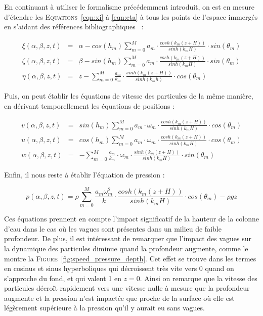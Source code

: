 				En continuant à utiliser le formalisme précédemment introduit, on est en mesure d'étendre les \textsc{Equations}~\ref{eqn:xi} à \ref{eqn:eta} à tous les points de l'espace immergés en s'aidant des références bibliographiques~\cite{dean1991water, MIT_Waves} :

				\begin{eqnarray}
					\xi(\alpha, \beta, z, t) & = & \alpha - cos(h_m) \sum_{m=0}^{M} a_m \cdot \frac{cosh(k_m(z+H))}{sinh(k_m H)} \cdot sin(\theta_m) \\
					\zeta(\alpha, \beta, z, t) & = & \beta - sin(h_m) \sum_{m=0}^{M} a_m \cdot \frac{cosh(k_m(z+H))}{sinh(k_m H)} \cdot sin(\theta_m) \\
					\eta(\alpha, \beta, z, t) & = & z - \sum_{m=0}^{M} \frac{a_m}{k_m} \cdot \frac{sinh(k_m(z+H))}{sinh(k_mh)} \cdot cos(\theta_m)
				\end{eqnarray}

				Puis, on peut établir les équations de vitesse des particules de la même manière, en dérivant temporellement les équations de positions :
		
				\begin{eqnarray}
					v(\alpha, \beta, z, t) & = & sin(h_m) \sum_{m=0}^{M} a_m \cdot \omega_m \cdot \frac{cosh(k_m(z+H))}{sinh(k_m H)} \cdot cos(\theta_m) \\
					u(\alpha, \beta, z, t) & = & cos(h_m) \sum_{m=0}^{M} a_m \cdot \omega_m \cdot \frac{cosh(k_m(z+H))}{sinh(k_m H)} \cdot cos(\theta_m) \\
					w(\alpha, \beta, z, t) & = & - \sum_{m=0}^{M} \frac{a_m}{k_m} \cdot \omega_m \cdot \frac{sinh(k_m(z+H))}{sinh(k_m H)} \cdot sin(\theta_m)
				\end{eqnarray}

				Enfin, il nous reste à établir l'équation de pression :

				\begin{equation}
					p(\alpha, \beta, z, t) = \rho \sum_{m=0}^{M} \frac{a_m\omega_m^2}{k} \cdot \frac{cosh(k_m(z+H))}{sinh(k_m H)} \cdot cos(\theta_m) - \rho g z
				\end{equation}

				Ces équations prennent en compte l'impact significatif de la hauteur de la colonne d'eau dans le cas où les vagues sont présentes dans un milieu de faible profondeur. De plus, il est intéressant de remarquer que l'impact des vagues sur la dynamique des particules diminue quand la profondeur augmente, comme le montre la \textsc{Figure}~\ref{fig:speed_pressure_depth}. Cet effet se trouve dans les termes en cosinus et sinus hyperboliques qui décroissent très vite vers 0 quand on s'approche du fond, et qui valent 1 en $z=0$. Ainsi on remarque que la vitesse des particules décroît rapidement vers une vitesse nulle à mesure que la profondeur augmente et la pression n'est impactée que proche de la surface où elle est légèrement supérieure à la pression qu'il y aurait eu sans vagues.

